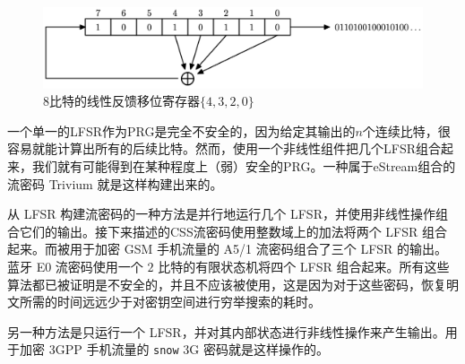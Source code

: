 \begin{figure}
  \centering
  \includegraphics[width=0.7\linewidth]{figures/chapter3/fig10.png}
  \caption{$8$比特的线性反馈移位寄存器$\{4,3,2,0\}$}
  \label{fig:3-10}
\end{figure}

\begin{snote}[来自LSFR的流密码。]
一个单一的LFSR作为PRG是完全不安全的，因为给定其输出的$n$个连续比特，很容易就能计算出所有的后续比特。然而，使用一个非线性组件把几个LFSR组合起来，我们就有可能得到在某种程度上（弱）安全的PRG。一种属于eStream组合的流密码 Trivium 就是这样构建出来的。

从 LFSR 构建流密码的一种方法是并行地运行几个 LFSR，并使用非线性操作组合它们的输出。接下来描述的CSS流密码使用整数域上的加法将两个 LFSR 组合起来。而被用于加密 GSM 手机流量的 A5/1 流密码组合了三个 LFSR 的输出。蓝牙 E0 流密码使用一个 $2$ 比特的有限状态机将四个 LFSR 组合起来。所有这些算法都已被证明是不安全的，并且不应该被使用，这是因为对于这些密码，恢复明文所需的时间远远少于对密钥空间进行穷举搜索的耗时。

另一种方法是只运行一个 LFSR，并对其内部状态进行非线性操作来产生输出。用于加密 3GPP 手机流量的 \texttt{snow} 3G 密码就是这样操作的。
\end{snote}

